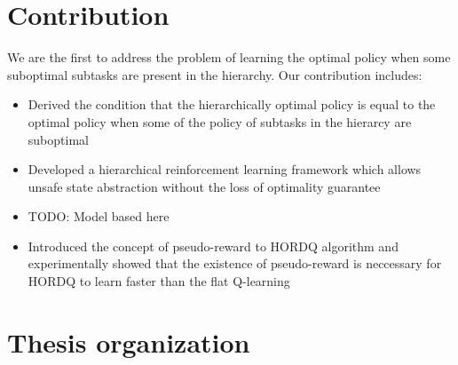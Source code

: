 \section{Contribution}
We are the first to address the problem of learning the optimal policy when some 
suboptimal subtasks are present in the hierarchy.
Our contribution includes: 
\begin{itemize}
\item Derived the condition that the hierarchically optimal policy is equal to the optimal policy when some of the policy of subtasks in the hierarcy are suboptimal
\item Developed a hierarchical reinforcement learning framework which allows unsafe state abstraction without the loss of optimality guarantee
\item TODO: Model based here
\item Introduced the concept of pseudo-reward to HORDQ algorithm and experimentally showed that the existence of pseudo-reward is neccessary for HORDQ to learn faster than the flat Q-learning
\end{itemize}

\section{Thesis organization}




\endinput
There was no clear advantage for either method in the second half of the experiment. We note that, asymptotically, model-free methods are never worse than model-based methods, and are often better because the model does not converge exactly to the true system because of structural modeling assumptions. (The case we treat here—linear models and value functions with one-step TD methods—is a rare case in which asymptotic performance of model-based and model-free methods should be identical.) The benefit of models, and of planning generally, is in rapid adaptation to new problems and situations 
